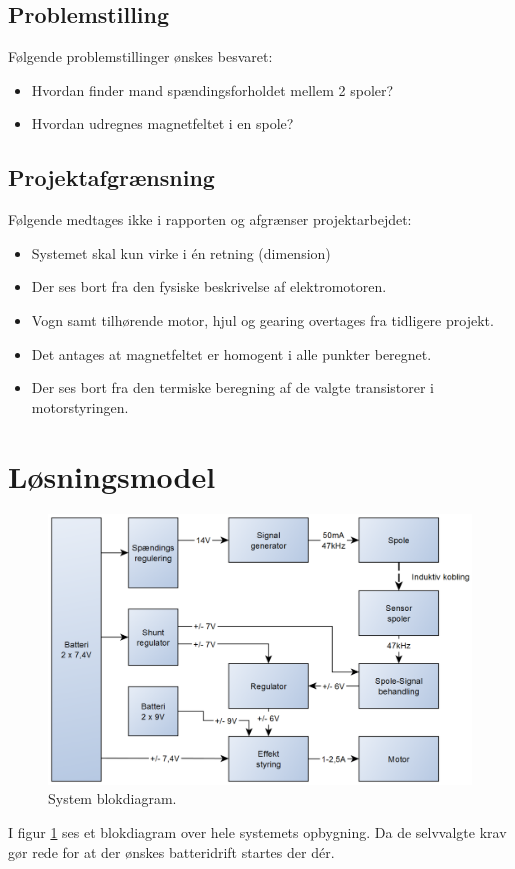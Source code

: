 \subsection{Problemstilling}
Følgende problemstillinger ønskes besvaret:
\begin{itemize}
\item Hvordan finder mand spændingsforholdet mellem 2 spoler?
\item Hvordan udregnes magnetfeltet i en spole?
\end{itemize}

\subsection{Projektafgrænsning}
Følgende medtages ikke i rapporten og afgrænser projektarbejdet:
\begin{itemize}
\item Systemet skal kun virke i én retning (dimension)
\item Der ses bort fra den fysiske beskrivelse af elektromotoren.
\item Vogn samt tilhørende motor, hjul og gearing overtages fra tidligere projekt.
\item Det antages at magnetfeltet er homogent i alle punkter beregnet.
\item Der ses bort fra den termiske beregning af de valgte transistorer i motorstyringen.
\end{itemize}

\section{Løsningsmodel}
\begin{figure}[h!]
	\centering
	\includegraphics[width=.9\textwidth]{diagram/blokdiagram1.png}
	\caption{System blokdiagram.}
	\label{fig:blockdiagram1}
\end{figure}
\FloatBlock
I figur \ref{fig:blockdiagram1} ses et blokdiagram over hele systemets opbygning. Da de selvvalgte krav gør rede for at der ønskes batteridrift startes der dér. 

